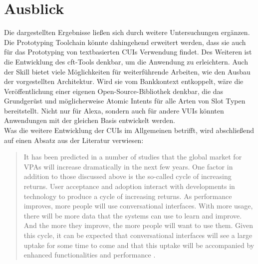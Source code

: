 \section{Ausblick}
\label{sec:ausblick}
Die dargestellten Ergebnisse ließen sich durch weitere Untersuchungen ergänzen. Die Prototyping Toolchain könnte dahingehend erweitert werden, dass sie auch für das Prototyping von textbasierten \acp{CUI} Verwendung findet. Des Weiteren ist die Entwicklung des cft-Tools denkbar, um die Anwendung zu erleichtern. Auch der Skill bietet viele Möglichkeiten für weiterführende Arbeiten, wie \zB den Ausbau der vorgestellten Architektur. Wird sie vom Bankkontext entkoppelt, wäre die Veröffentlichung einer eigenen Open-Source-Bibliothek denkbar, die das Grundgerüst und möglicherweise Atomic Intents für alle Arten von Slot Typen bereitstellt. Nicht nur für Alexa, sondern auch für andere \acp{VUI} könnten Anwendungen mit der gleichen Basis entwickelt werden.\\
Was die weitere Entwicklung der \acp{CUI} im Allgemeinen betrifft, wird abschließend auf einen Absatz aus der Literatur verwiesen:
\begin{quote}
It has been predicted in a number of studies that the global market for VPAs will increase dramatically in the next few years. One factor in addition to those discussed above is the so-called cycle of increasing returns. User acceptance and adoption interact with developments in technology to produce a cycle of increasing returns. As performance improves, more people will use conversational interfaces. With more usage, there will be more data that the systems can use to learn and improve. And the more they improve, the more people will want to use them. Given this cycle, it can be expected that conversational interfaces will see a large uptake for some time to come and that this uptake will be accompanied by enhanced functionalities and performance \cite{mctear-cui}. 
\end{quote}